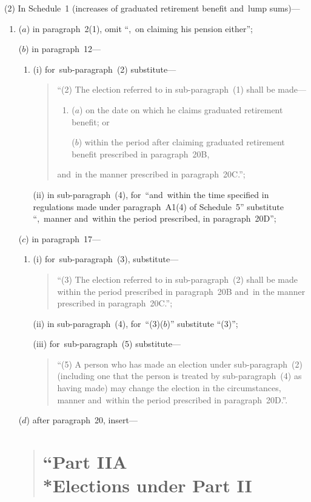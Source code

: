 \documentclass[12pt,a4paper]{article}
\begin{document}
(2) In Schedule~1 (increases of graduated retirement benefit and~lump sums)—
\begin{enumerate}\item[]
($a$) in paragraph~2(1), omit “,~on claiming his pension either”;

($b$) in paragraph~12—
\begin{enumerate}\item[]
(i) for~sub-paragraph~(2) substitute—
\begin{quotation}
“(2) The election referred to in sub-paragraph~(1) shall be made—
\begin{enumerate}\item[]
($a$) on the date on which he claims graduated retirement benefit; or

($b$) within the period after claiming graduated retirement benefit prescribed in paragraph~20B,
\end{enumerate}
and~in the manner prescribed in paragraph~20C.”;
\end{quotation}

(ii) in sub-paragraph~(4), for~“and~within the time specified in regulations made under paragraph~A1(4) of Schedule~5” substitute “,~manner and~within the period prescribed, in paragraph~20D”;
\end{enumerate}

($c$) in paragraph~17—
\begin{enumerate}\item[]
(i) for~sub-paragraph~(3), substitute—
\begin{quotation}
“(3) The election referred to in sub-paragraph~(2) shall be made within the period prescribed in paragraph~20B and~in the manner prescribed in paragraph~20C.”;
\end{quotation}

(ii) in sub-paragraph~(4), for~“(3)($b$)” substitute “(3)”;

(iii) for~sub-paragraph~(5) substitute—
\begin{quotation}
“(5) A person who has made an election under sub-paragraph~(2) (including one that the person is treated by sub-paragraph~(4) as having made) may change the election in the circumstances, manner and~within the period prescribed in paragraph~20D.”.
\end{quotation}
\end{enumerate}

($d$) after paragraph~20, insert—
\begin{quotation}
\section*{“Part IIA\\*Elections under Part II}


\end{quotation}
\end{enumerate}
\end{document}
